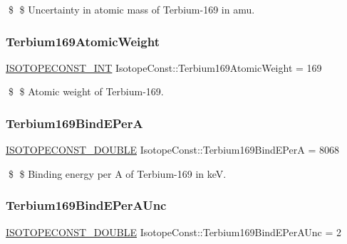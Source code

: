 \$ \$ Uncertainty in atomic mass of Terbium-\/169 in amu. \mbox{\label{group___isotope_const-_terbium-_tb169_gae640050ebcb10117759b7906a1359c92}} 
\subsubsection{\texorpdfstring{Terbium169\+Atomic\+Weight}{Terbium169AtomicWeight}}
{\footnotesize\ttfamily \mbox{\hyperlink{group___isotope_const-_macros_ga5f18360b3e99483a35c32d789e62621c}{I\+S\+O\+T\+O\+P\+E\+C\+O\+N\+S\+T\+\_\+\+I\+NT}} Isotope\+Const\+::\+Terbium169\+Atomic\+Weight = 169}

\$ \$ Atomic weight of Terbium-\/169. \mbox{\label{group___isotope_const-_terbium-_tb169_ga2036083012ead2f50e9e63f0468a5683}} 
\subsubsection{\texorpdfstring{Terbium169\+Bind\+E\+PerA}{Terbium169BindEPerA}}
{\footnotesize\ttfamily \mbox{\hyperlink{group___isotope_const-_macros_ga8f45a7272ce02c0b4c65c44636ed719a}{I\+S\+O\+T\+O\+P\+E\+C\+O\+N\+S\+T\+\_\+\+D\+O\+U\+B\+LE}} Isotope\+Const\+::\+Terbium169\+Bind\+E\+PerA = 8068}

\$ \$ Binding energy per A of Terbium-\/169 in keV. \mbox{\label{group___isotope_const-_terbium-_tb169_gad992d56a77eb4b87927a2cb2d88f2823}} 
\subsubsection{\texorpdfstring{Terbium169\+Bind\+E\+Per\+A\+Unc}{Terbium169BindEPerAUnc}}
{\footnotesize\ttfamily \mbox{\hyperlink{group___isotope_const-_macros_ga8f45a7272ce02c0b4c65c44636ed719a}{I\+S\+O\+T\+O\+P\+E\+C\+O\+N\+S\+T\+\_\+\+D\+O\+U\+B\+LE}} Isotope\+Const\+::\+Terbium169\+Bind\+E\+Per\+A\+Unc = 2}

